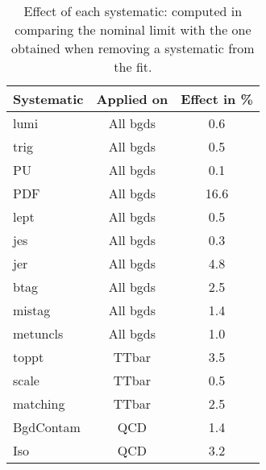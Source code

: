 \documentclass[10pt]{article}
\begin{document}
\begin{table}[!ht]
\begin{center}
\begin{tabular}{|l|c|c|}
\hline
\hline
\hline
\textbf{Systematic} & \textbf{Applied on} & \textbf{Effect in \%}\\
\hline
lumi            & All bgds  & 0.6   \\
trig            & All bgds  & 0.5   \\
PU              & All bgds  & 0.1   \\
PDF             & All bgds  & 16.6   \\
lept            & All bgds  & 0.5   \\
jes             & All bgds  & 0.3   \\
jer             & All bgds  & 4.8   \\
btag            & All bgds  & 2.5   \\
mistag          & All bgds  & 1.4   \\
metuncls        & All bgds  & 1.0   \\
toppt           & TTbar     & 3.5   \\
scale           & TTbar     & 0.5   \\
matching        & TTbar     & 2.5   \\
BgdContam       & QCD       & 1.4   \\
Iso             & QCD       & 3.2   \\
\hline
\hline

\hline
\hline
\end{tabular}
\caption{Effect of each systematic: computed in comparing the nominal limit with the one obtained when removing a systematic from the fit.}
\label{tab:SFtable}
\end{center}
\end{table} 
\end{document}
